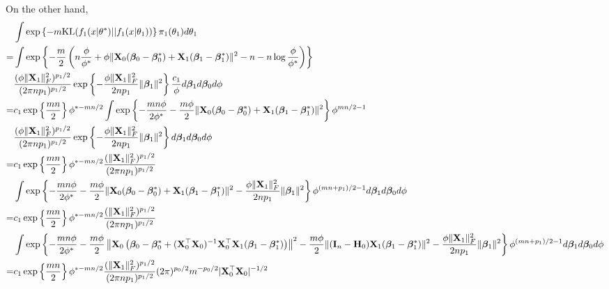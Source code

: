 \documentclass[11pt]{article}
\newcommand{\bfsym}[1]{\ensuremath{\boldsymbol{#1}}}
\def\bbeta{\bfsym \beta}
\theoremstyle{plain}
\theoremstyle{definition}
\theoremstyle{remark}
\begin{document}
On the other hand,
\begin{equation*}
    \begin{split}
    &\int 
\exp\left\{-m \text{KL}(f_1(x|\theta^*)||f_1(x|\theta_1))\right\}
     \pi_1(\theta_1) d\theta_1
     \\
     =&
    \int 
\exp\left\{
    -\frac m 2
    \left(
        n\frac{\phi}{\phi^*}
        +
        \phi\|\BX_0 (\bbeta_0-\bbeta_0^*) + \BX_1 (\bbeta_1-\bbeta_1^*)\|^2
            -n
        -n \log \frac{ \phi }{ \phi^* }
    \right)
\right\}
\\
&
    \frac{(\phi \|\BX_1\|_F^2)^{p_1/2}}{(2\pi n p_1 )^{p_1/2}}  
    \exp\left\{
        -\frac{\phi \|\BX_1\|_F^2}{2 n p_1} \|\bbeta_1\|^2
    \right\}
    \frac{c_1}{\phi}
d\bbeta_1 d\bbeta_0 d\phi
     \\
     =&
     c_1\exp\left\{ \frac{mn}{2}\right\}
     \phi^{*-mn/2}
    \int 
\exp\left\{
        -\frac{mn\phi}{2\phi^*}
        -\frac{m\phi}{2}\|\BX_0 (\bbeta_0-\bbeta_0^*) + \BX_1 (\bbeta_1-\bbeta_1^*)\|^2
\right\}
\phi^{mn/2-1}
\\
&
    \frac{(\phi \|\BX_1\|_F^2)^{p_1/2}}{(2\pi n p_1 )^{p_1/2}}  
    \exp\left\{
        -\frac{\phi \|\BX_1\|_F^2}{2 n p_1} \|\bbeta_1\|^2
    \right\}
d\bbeta_1 d\bbeta_0 d\phi
     \\
     =&
     c_1\exp\left\{ \frac{mn}{2}\right\}
     \phi^{*-mn/2}
    \frac{( \|\BX_1\|_F^2)^{p_1/2}}{(2\pi n p_1 )^{p_1/2}}  
    \\
    &\int 
\exp\left\{
        -\frac{mn\phi}{2\phi^*}
        -\frac{m\phi}{2}\|\BX_0 (\bbeta_0-\bbeta_0^*) + \BX_1 (\bbeta_1-\bbeta_1^*)\|^2
        -\frac{\phi \|\BX_1\|_F^2}{2 n p_1} \|\bbeta_1\|^2
\right\}
\phi^{(mn+p_1)/2-1}
d\bbeta_1 d\bbeta_0 d\phi
     \\
     =&
     c_1\exp\left\{ \frac{mn}{2}\right\}
     \phi^{*-mn/2}
    \frac{( \|\BX_1\|_F^2)^{p_1/2}}{(2\pi n p_1 )^{p_1/2}}  
    \\
    &\int 
\exp\left\{
        -\frac{mn\phi}{2\phi^*}
        -\frac{m\phi}{2}\left\|\BX_0 \left(\bbeta_0-\bbeta_0^* + (\BX_0^\top \BX_0)^{-1} \BX_0^\top \BX_1 (\bbeta_1-\bbeta_1^*)\right)\right\|^2
        -\frac{m\phi}{2}\|(\BI_n-\BH_0)\BX_1(\bbeta_1-\bbeta_1^*)\|^2
        -\frac{\phi \|\BX_1\|_F^2}{2 n p_1} \|\bbeta_1\|^2
\right\}
\phi^{(mn+p_1)/2-1}
d\bbeta_1 d\bbeta_0 d\phi
     \\
     =&
     c_1\exp\left\{ \frac{mn}{2}\right\}
     \phi^{*-mn/2}
    \frac{( \|\BX_1\|_F^2)^{p_1/2}}{(2\pi n p_1 )^{p_1/2}}  
    (2\pi)^{p_0/2} m^{-p_0/2} |\BX_0^\top \BX_0|^{-1/2}

\end{split}
\end{equation*}
\end{document}
